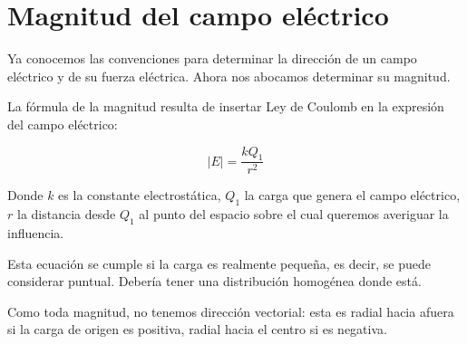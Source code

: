 \section{Magnitud del campo eléctrico}

Ya conocemos las convenciones para determinar la dirección 
de un campo eléctrico y de su fuerza eléctrica.
Ahora nos abocamos determinar su magnitud.

La fórmula de la magnitud resulta de insertar Ley de Coulomb 
en la expresión del campo eléctrico:

\vspace{.3cm}
\begin{equation}
    |E| = \frac{kQ_1}{r^{2}}
\end{equation}
\vspace{.3cm}

Donde \(k\) es la constante electrostática,
\(Q_1\) la carga que genera el campo eléctrico,
\(r\) la distancia desde \(Q_1\) al punto
del espacio sobre el cual queremos averiguar la influencia.

Esta ecuación se cumple si la carga es realmente pequeña,
es decir,
se puede considerar puntual.
Debería tener una distribución homogénea donde está.

Como toda magnitud, no tenemos dirección vectorial:
esta es radial hacia afuera si la carga de origen es positiva,
radial hacia el centro si es negativa.